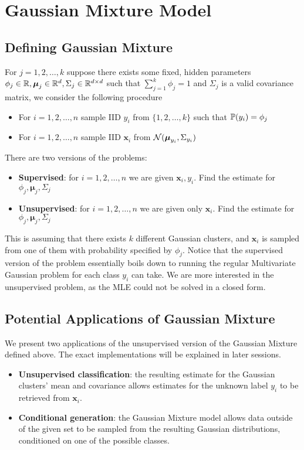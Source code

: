 \section{Gaussian Mixture Model}
\subsection{Defining Gaussian Mixture}
\begin{definition}
    For $j=1,2,\dots,k$ suppose there exists some fixed, hidden parameters $\phi_j \in \mathbb{R},\boldsymbol{\mu}_j \in \mathbb{R}^d,\Sigma_j \in \mathbb{R}^{d\times d}$ such that $\sum_{j=1}^k \phi_j = 1$ and $\Sigma_j$ is a valid covariance matrix, we consider the following procedure
    \begin{itemize}
        \item For $i=1,2,\dots,n$ sample IID $y_i$ from $\{1,2,\dots,k\}$ such that $\mathbb{P}(y_i)=\phi_j$
        \item For $i=1,2,\dots,n$ sample IID $\textbf{x}_i$ from $\mathcal{N}(\boldsymbol{\mu}_{y_i},\Sigma_{y_i})$
    \end{itemize}
    There are two versions of the problems:
    \begin{itemize}
        \item \textbf{Supervised}: for $i=1,2,\dots,n$ we are given $\textbf{x}_i,y_i$. Find the estimate for $\phi_j,\boldsymbol{\mu}_j,\Sigma_j$
        \item \textbf{Unsupervised}: for $i=1,2,\dots,n$ we are given only $\textbf{x}_i$. Find the estimate for $\phi_j,\boldsymbol{\mu}_j,\Sigma_j$
    \end{itemize}
\end{definition}
This is assuming that there exists $k$ different Gaussian clusters, and $\mathbf{x}_i$ is sampled from one of them with probability specified by $\phi_j$. Notice that the supervised version of the problem essentially boils down to running the regular Multivariate Gaussian problem for each class $y_i$ can take. We are more interested in the unsupervised problem, as the MLE could not be solved in a closed form.
\subsection{Potential Applications of Gaussian Mixture}
We present two applications of the unsupervised version of the Gaussian Mixture defined above. The exact implementations will be explained in later sessions.
\begin{itemize}
    \item \textbf{Unsupervised classification}: the resulting estimate for the Gaussian clusters' mean and covariance allows estimates for the unknown label $y_i$ to be retrieved from $\textbf{x}_i$.
    \item \textbf{Conditional generation}: the Gaussian Mixture model allows data outside of the given set to be sampled from the resulting Gaussian distributions, conditioned on one of the possible classes.
\end{itemize}
